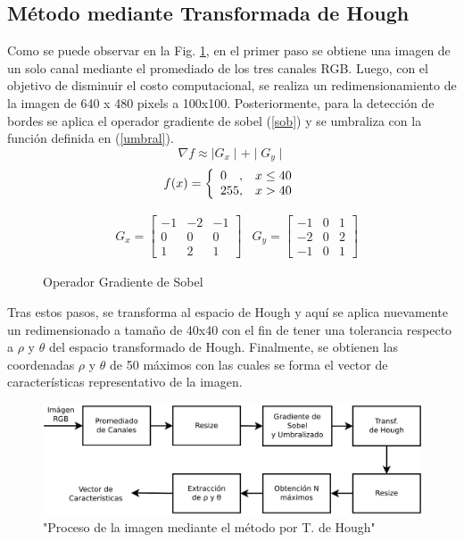 \documentclass[conference,spanish,a4paper,10pt,oneside,final]{tfmpd}
\begin{document}
\subsection*{Método mediante Transformada de Hough}
Como se puede observar en la Fig. \ref{procesohough}, en el primer paso se obtiene una imagen de un solo canal mediante el promediado de los tres canales RGB. Luego, con el objetivo de disminuir el costo computacional, se realiza un redimensionamiento de la imagen de 640 x 480 pixels a 100x100. Posteriormente, para la detección de bordes se aplica el operador gradiente de sobel (\ref{sob}) y se umbraliza con la función definida en (\ref{umbral}).
\begin{equation}
\nabla f \approx \mid G_x \mid + \mid G_y \mid \label{sob}
\end{equation}
%
\begin{equation}\label{umbral}
f(x) = \left\{
\begin{array}{l@{,\quad}l}
0 & x \leq 40\\
255 & x>40
\end{array}
\right.
\end{equation}
%
%
\begin{figure}
\begin{align*}
& G_x = \left[
\begin{array}{ccc}
-1 & -2 & -1\\
 0 & 0 & 0 \\
 1 & 2 & 1
\end{array}
\right]
&G_y = \left[
\begin{array}{ccc}
-1 & 0 & 1\\
 -2 & 0 & 2 \\
 -1 & 0 & 1
\end{array}
\right]
\end{align*}
\caption{Operador Gradiente de Sobel}
\end{figure}
Tras estos pasos, se transforma al espacio de Hough y aquí se aplica nuevamente un redimensionado a tamaño de 40x40 con el fin de tener una tolerancia respecto a $\rho$ y $\theta$ del espacio transformado de Hough.
Finalmente, se obtienen las coordenadas $\rho$ y $\theta$ de 50 máximos con las cuales se forma el vector de características representativo de la imagen.
\begin{figure}
\includegraphics[scale=0.25]{../diagramas/procesohough} 
\caption{"Proceso de la imagen mediante el método por T. de Hough"}
\label{procesohough}
\end{figure}
\end{document}
